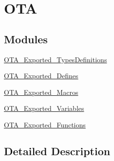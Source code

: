 \hypertarget{group___o_t_a}{}\section{O\+TA}
\label{group___o_t_a}
\subsection*{Modules}
\begin{DoxyCompactItemize}
\item 
\mbox{\hyperlink{group___o_t_a___exported___types_definitions}{O\+T\+A\+\_\+\+Exported\+\_\+\+Types\+Definitions}}
\item 
\mbox{\hyperlink{group___o_t_a___exported___defines}{O\+T\+A\+\_\+\+Exported\+\_\+\+Defines}}
\item 
\mbox{\hyperlink{group___o_t_a___exported___macros}{O\+T\+A\+\_\+\+Exported\+\_\+\+Macros}}
\item 
\mbox{\hyperlink{group___o_t_a___exported___variables}{O\+T\+A\+\_\+\+Exported\+\_\+\+Variables}}
\item 
\mbox{\hyperlink{group___o_t_a___exported___functions}{O\+T\+A\+\_\+\+Exported\+\_\+\+Functions}}
\end{DoxyCompactItemize}


\subsection{Detailed Description}
